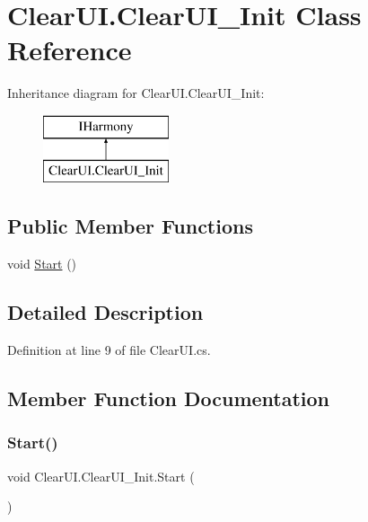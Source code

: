 \hypertarget{class_clear_u_i_1_1_clear_u_i___init}{}\section{Clear\+U\+I.\+Clear\+U\+I\+\_\+\+Init Class Reference}
\label{class_clear_u_i_1_1_clear_u_i___init}
Inheritance diagram for Clear\+U\+I.\+Clear\+U\+I\+\_\+\+Init\+:\begin{figure}[H]
\begin{center}
\leavevmode
\includegraphics[height=2.000000cm]{class_clear_u_i_1_1_clear_u_i___init}
\end{center}
\end{figure}
\subsection*{Public Member Functions}
\begin{DoxyCompactItemize}
\item 
void \mbox{\hyperlink{class_clear_u_i_1_1_clear_u_i___init_a35f6f2977d035f33ab9f0e63e02dae9d}{Start}} ()
\end{DoxyCompactItemize}


\subsection{Detailed Description}


Definition at line 9 of file Clear\+U\+I.\+cs.



\subsection{Member Function Documentation}
\mbox{\label{class_clear_u_i_1_1_clear_u_i___init_a35f6f2977d035f33ab9f0e63e02dae9d}} 
\subsubsection{\texorpdfstring{Start()}{Start()}}
{\footnotesize\ttfamily void Clear\+U\+I.\+Clear\+U\+I\+\_\+\+Init.\+Start (\begin{DoxyParamCaption}{ }\end{DoxyParamCaption})}



